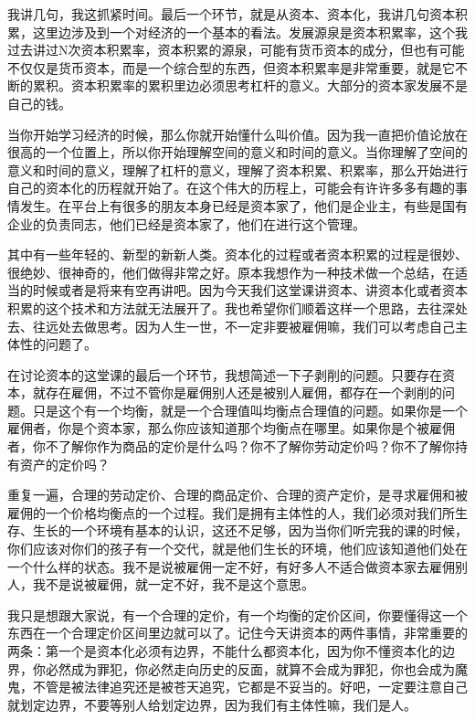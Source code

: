 \documentclass[UTF8, 12pt, a4paper]{ctexrep}
\begin{document}
我讲几句，我这抓紧时间。最后一个环节，就是从资本、资本化，我讲几句资本积累，这里边涉及到一个对经济的一个基本的看法。发展源泉是资本积累率，这个我过去讲过N次资本积累率，资本积累的源泉，可能有货币资本的成分，但也有可能不仅仅是货币资本，而是一个综合型的东西，但资本积累率是非常重要，就是它不断的累积。资本积累率的累积里边必须思考杠杆的意义。大部分的资本家发展不是自己的钱。

当你开始学习经济的时候，那么你就开始懂什么叫价值。因为我一直把价值论放在很高的一个位置上，所以你开始理解空间的意义和时间的意义。当你理解了空间的意义和时间的意义，理解了杠杆的意义，理解了资本积累、积累率，那么开始进行自己的资本化的历程就开始了。在这个伟大的历程上，可能会有许许多多有趣的事情发生。在平台上有很多的朋友本身已经是资本家了，他们是企业主，有些是国有企业的负责同志，他们已经是资本家了，他们在进行这个管理。

其中有一些年轻的、新型的新新人类。资本化的过程或者资本积累的过程是很妙、很绝妙、很神奇的，他们做得非常之好。原本我想作为一种技术做一个总结，在适当的时候或者是将来有空再讲吧。因为今天我们这堂课讲资本、讲资本化或者资本积累的这个技术和方法就无法展开了。我也希望你们顺着这样一个思路，去往深处去、往远处去做思考。因为人生一世，不一定非要被雇佣嘛，我们可以考虑自己主体性的问题了。

在讨论资本的这堂课的最后一个环节，我想简述一下子剥削的问题。只要存在资本，就存在雇佣，不过不管你是雇佣别人还是被别人雇佣，都存在一个剥削的问题。只是这个有一个均衡，就是一个合理值叫均衡点合理值的问题。如果你是一个雇佣者，你是个资本家，那么你应该知道那个均衡点在哪里。如果你是个被雇佣者，你不了解你作为商品的定价是什么吗？你不了解你劳动定价吗？你不了解你持有资产的定价吗？

重复一遍，合理的劳动定价、合理的商品定价、合理的资产定价，是寻求雇佣和被雇佣的一个价格均衡点的一个过程。我们是拥有主体性的人，我们必须对我们所生存、生长的一个环境有基本的认识，这还不足够，因为当你们听完我的课的时候，你们应该对你们的孩子有一个交代，就是他们生长的环境，他们应该知道他们处在一个什么样的状态。我不是说被雇佣一定不好，有好多人不适合做资本家去雇佣别人，我不是说被雇佣，就一定不好，我不是这个意思。

我只是想跟大家说，有一个合理的定价，有一个均衡的定价区间，你要懂得这一个东西在一个合理定价区间里边就可以了。记住今天讲资本的两件事情，非常重要的两条：第一个是资本化必须有边界，不能什么都资本化，因为你不懂资本化的边界，你必然成为罪犯，你必然走向历史的反面，就算不会成为罪犯，你也会成为魔鬼，不管是被法律追究还是被苍天追究，它都是不妥当的。好吧，一定要注意自己就划定边界，不要等别人给划定边界，因为我们有主体性嘛，我们是人。
\end{document}
